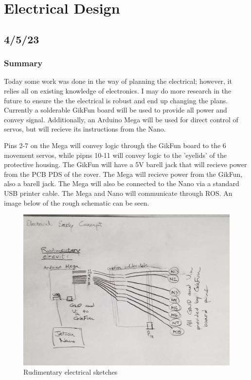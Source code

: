 \documentclass[a4paper, 10pt]{article}
\begin{document}
	
\newpage	
	
\section{Electrical Design}
	\subsection{4/5/23}
		\subsubsection{Summary}
		Today some work was done in the way of planning the electrical; however, it relies all on existing knowledge of electronics. I may do more research in the future to ensure the the electrical is robust and end up changing the plans. Currently a solderable GikFun board will be used to provide all power and convey signal. Additionally, an Arduino Mega will be used for direct control of servos, but will recieve its instructions from the Nano. 
		
		Pins 2-7 on the Mega will convey logic through the GikFun board to the 6 movement servos, while pipns 10-11 will convey logic to the 'eyelids' of the protective housing. The GikFun will have a 5V barell jack that will recieve power from the PCB PDS of the rover. The Mega will recieve power from the GikFun, also a barell jack. The Mega will also be connected to the Nano via a standard USB printer cable. The Mega and Nano will communicate through ROS. An image below of the rough schematic can be seen.
		
		\begin{figure} [h]
			\centering
			\includegraphics[scale=0.2]{early_electrical}
			\caption{Rudimentary electrical sketches}
			\label{basic_electrical}
		\end{figure}
		
\end{document}
